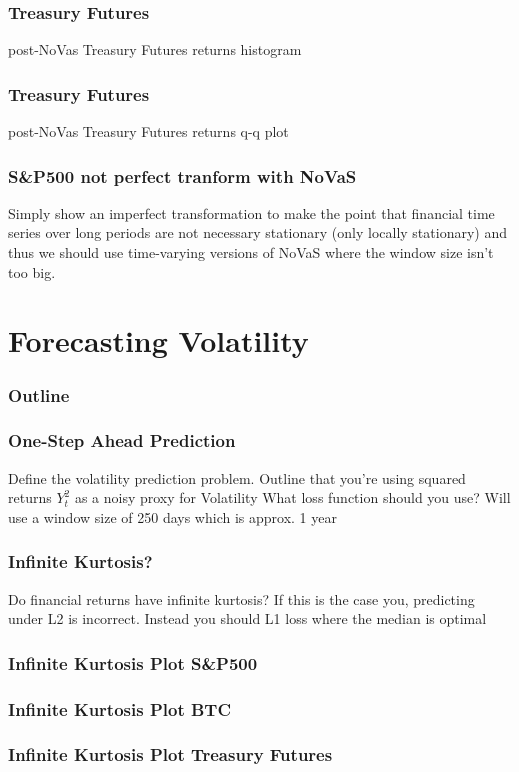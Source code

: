 \documentclass{beamer}
\begin{document}
\begin{frame}
\frametitle{Treasury Futures}
post-NoVas Treasury Futures returns histogram
\end{frame}

\begin{frame}
\frametitle{Treasury Futures}
post-NoVas Treasury Futures returns q-q plot
\end{frame}

\begin{frame}
\frametitle{S&P500 not perfect tranform with NoVaS}
Simply show an imperfect transformation to make the point that financial time series over long periods are not necessary stationary (only locally stationary) and thus we should use time-varying versions of NoVaS where the window size isn't too big.
\end{frame}


\section{Forecasting Volatility}

\begin{frame}
\frametitle{Outline}
\tableofcontents[currentsection]
\end{frame}

\begin{frame}
\frametitle{One-Step Ahead Prediction}
Define the volatility prediction problem.
Outline that you're using squared returns $Y_{t}^2$ as a noisy proxy for Volatility
What loss function should you use?
Will use a window size of 250 days which is approx. 1 year
\end{frame}

\begin{frame}
\frametitle{Infinite Kurtosis?}
Do financial returns have infinite kurtosis?
If this is the case you, predicting under L2 is incorrect. Instead you should L1 loss where the median is optimal
\end{frame}

\begin{frame}
\frametitle{Infinite Kurtosis Plot S&P500}

\end{frame}

\begin{frame}
\frametitle{Infinite Kurtosis Plot BTC}

\end{frame}

\begin{frame}
\frametitle{Infinite Kurtosis Plot Treasury Futures}

\end{frame}
\end{document}
